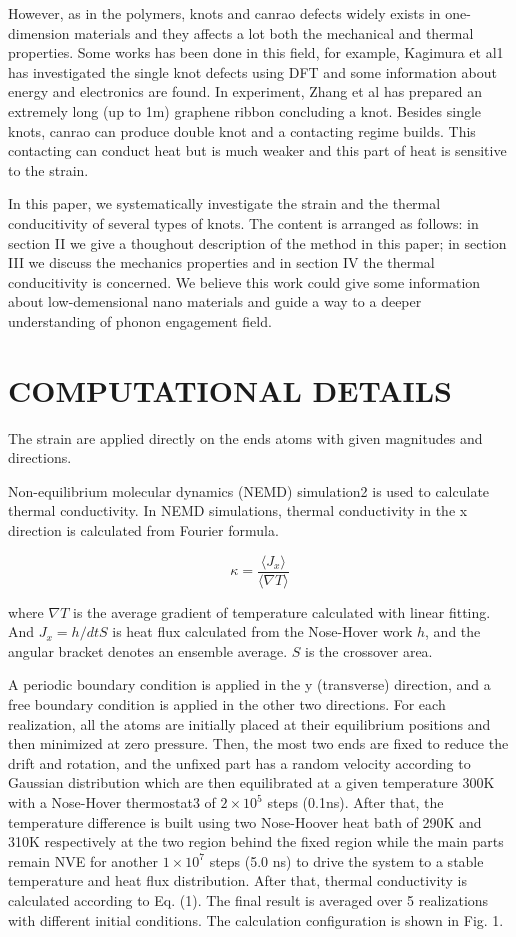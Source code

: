 \documentclass[%
 reprint,
 amsmath,amssymb,
 aps,
prb,
]{revtex4-1}
\begin{document}
However, as in the polymers, knots and canrao defects widely exists in one-dimension materials and they affects a lot both the mechanical and thermal properties. Some works has been done in this field, for example, Kagimura et al1 has investigated the single knot defects using DFT and some information about energy and electronics are found. In experiment, Zhang et al has prepared an extremely long (up to 1m) graphene ribbon concluding a knot. Besides single knots, canrao can produce double knot and a contacting regime builds. This contacting can conduct heat but is much weaker and this part of heat is sensitive to the strain.

In this paper, we systematically investigate the strain and the thermal conducitivity of several types of knots. The content is arranged as follows: in section II we give a thoughout description of the method in this paper; in section III we discuss the mechanics properties and in section IV the thermal conducitivity is concerned. We believe this work could give some information about low-demensional nano materials and guide a way to a deeper understanding of phonon engagement field.

\section{COMPUTATIONAL DETAILS}

The strain are applied directly on the ends atoms with given magnitudes and directions.

Non-equilibrium molecular dynamics (NEMD) simulation2 is used to calculate thermal conductivity. In NEMD simulations, thermal conductivity in the x direction is calculated from Fourier formula.

\begin{equation}
  \kappa = \frac{\langle J_x\rangle}{\langle \nabla T\rangle}
\end{equation}

where $\nabla T$ is the average gradient of temperature calculated with linear fitting. And $J_x=h/dt S$ is heat flux calculated from the Nose-Hover work $h$, and the angular bracket denotes an ensemble average. $S$ is the crossover area.

A periodic boundary condition is applied in the y (transverse) direction, and a free boundary condition is applied in the other two directions. For each realization, all the atoms are initially placed at their equilibrium positions and then minimized at zero pressure. Then, the most two ends are fixed to reduce the drift and rotation, and the unfixed part has a random velocity according to Gaussian distribution which are then equilibrated at a given temperature 300K with a Nose-Hover thermostat3 of $2 \times10^5$ steps (0.1ns). After that, the temperature difference is built using two Nose-Hoover heat bath of 290K and 310K respectively at the two region behind the fixed region while the main parts remain NVE for another $1 \times10^7$ steps (5.0 ns) to drive the system to a stable temperature and heat flux distribution. After that, thermal conductivity is calculated according to Eq. (1). The final result is averaged over 5 realizations with different initial conditions. The calculation configuration is shown in Fig. 1.
\end{document}
